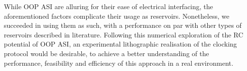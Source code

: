 While OOP ASI are alluring for their ease of electrical interfacing, the aforementioned factors complicate their usage as reservoirs.
Nonetheless, we succeeded in using them as such, with a performance on par with other types of reservoirs described in literature.
Following this numerical exploration of the RC potential of OOP ASI, an experimental lithographic realisation of the clocking protocol would be desirable, to achieve a better understanding of the performance, feasibility and efficiency of this approach in a real environment.






